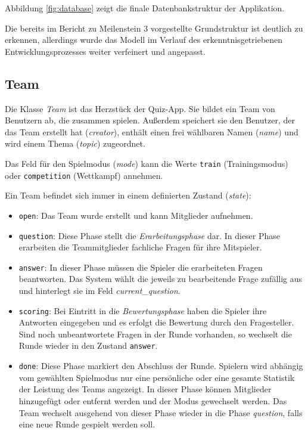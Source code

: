 \documentclass[a4paper,11pt,listof=numbered,glossary=totoc,parskip=half,toc=bib]{scrreprt}
\begin{document}
	Abbildung \ref{fig:database} zeigt die finale Datenbankstruktur der Applikation.
	
	Die bereits im Bericht zu Meilenstein 3 vorgestellte Grundstruktur ist deutlich zu erkennen, allerdings wurde das Modell im Verlauf des erkenntnisgetriebenen Entwicklungsprozesses weiter verfeinert und angepasst.
	
		\subsection{Team}
	Die Klasse \textit{Team} ist das Herzstück der Quiz-App. Sie bildet ein Team von Benutzern ab, die zusammen spielen. Außerdem speichert sie den Benutzer, der das Team erstellt hat (\textit{creator}), enthält einen frei wählbaren Namen (\textit{name}) und wird einem Thema (\textit{topic}) zugeordnet.
	
	Das Feld für den Spielmodus (\textit{mode}) kann die Werte \texttt{train} (Trainingsmodus) oder \texttt{competition} (Wettkampf) annehmen.
	
	Ein Team befindet sich immer in einem definierten Zustand (\textit{state}):
	
	\begin{itemize}
		\item \texttt{open}: Das Team wurde erstellt und kann Mitglieder aufnehmen.
		\item \texttt{question}: Diese Phase stellt die \textit{Erarbeitungsphase} dar. In dieser Phase erarbeiten die Teammitglieder fachliche Fragen für ihre Mitspieler. 
		\item \texttt{answer}: In dieser Phase müssen die Spieler die erarbeiteten Fragen beantworten. Das System wählt die jeweils zu bearbeitende Frage zufällig aus und hinterlegt sie im Feld \textit{current\_{}question}.
		\item \texttt{scoring}: Bei Eintritt in die \textit{Bewertungsphase} haben die Spieler ihre Antworten eingegeben und es erfolgt die Bewertung durch den Fragesteller. Sind noch unbeantwortete Fragen in der Runde vorhanden, so wechselt die Runde wieder in den Zustand \texttt{answer}.
		
		\item \texttt{done}: Diese Phase markiert den Abschluss der Runde. Spielern wird abhängig vom gewählten Spielmodus nur eine persönliche oder eine gesamte Statistik der Leistung des Teams angezeigt. In dieser Phase können Mitglieder hinzugefügt oder entfernt werden und der Modus gewechselt werden. Das Team wechselt ausgehend von dieser Phase wieder in die Phase \textit{question}, falls eine neue Runde gespielt werden soll.
		
	\end{itemize}
	
\end{document}
